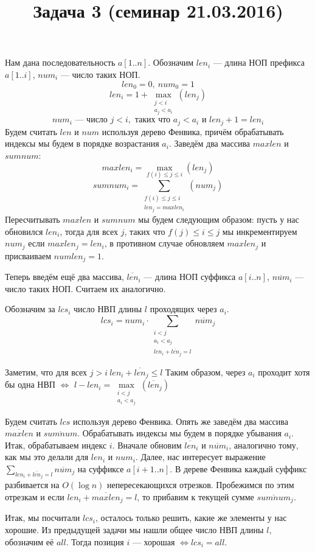 \documentclass{article}
\title{Задача 3 (семинар 21.03.2016)}
\author{}
\date{}
\newcommand{\olen}{\overline{len}}
\newcommand{\onum}{\overline{num}}
\newcommand{\omaxlen}{\overline{maxlen}}
\newcommand{\osumnum}{\overline{sumnum}}
\newcommand{\logn}{\log n}
\newcommand{\Ologn}{O(\logn)}
\begin{document}
\maketitle
Нам дана последовательность $a[1..n]$.
Обозначим $len_i$ --- длина НОП префикса $a[1..i]$, $num_i$ --- число таких НОП. 
$$len_0=0,\ num_0 = 1$$
$$len_i=1+\max\limits_{\substack{j<i\\ a_j<a_i}}(len_j)$$
$$num_i\text{ --- число } j<i, \text{ таких что } a_j<a_i \text{ и } len_j+1=len_i$$
Будем считать $len$ и $num$ используя дерево Фенвика, причём обрабатывать индексы мы будем в порядке возрастания $a_i$. Заведём два массива $maxlen$ и $sumnum$: 
$$maxlen_i=\max\limits_{f(i) \leq j \leq i}(len_j)$$
$$sumnum_i=\sum\limits_{\substack{f(i) \leq j \leq i\\ len_j=maxlen_i}}(num_j)$$
Пересчитывать $maxlen$ и $sumnum$ мы будем следующим образом: пусть у нас обновился $len_i$, тогда для всех $j$, таких что $f(j)\leq i\leq j$ мы инкрементируем $num_j$ если $maxlen_j=len_i$, в противном случае обновляем $maxlen_j$ и присваиваем $numlen_j=1$.

Теперь введём ещё два массива, $\olen_i$ --- длина НОП суффикса $a[i..n]$, $\onum_i$ --- число таких НОП. Считаем их аналогично.

Обозначим за $lcs_i$ число НВП длины $l$ проходящих через $a_i$.
$$lcs_i=num_i\cdot \sum\limits_{\substack{i<j\\ a_i<a_j\\ len_i+\olen_j=l}}\onum_j$$

Заметим, что для всех $j>i\ len_i+\olen_j\leq l$
Таким образом, через $a_i$ проходит хотя бы одна НВП $\iff$ $l-len_i=\max\limits_{\substack{i<j\\ a_i<a_j}}(\olen_j)$

Будем считать $lcs$ используя дерево Фенвика. Опять же заведём два массива $\omaxlen$ и $\osumnum$. Обрабатывать индексы мы будем в порядке убывания $a_i$. Итак, обрабатываем индекс $i$. Вначале обновим $\olen_i$ и $\onum_i$, аналогично тому, как мы это делали для $len_i$ и $num_i$. Далее, нас интересует выражение $\sum\limits_{len_i+\olen_j=l}\onum_j$ на суффиксе $a[i+1..n]$. В дереве Фенвика каждый суффикс разбивается на $\Ologn$ непересекающихся отрезков. Пробежимся по этим отрезкам и если $len_i+\omaxlen_j=l$, то прибавим к текущей сумме $\osumnum_j$.

Итак, мы посчитали $lcs_i$, осталось только решить, какие же элементы у нас хорошие. Из предыдущей задачи мы нашли общее число НВП длины $l$, обозначим её $all$. Тогда позиция $i$ --- хорошая $\iff lcs_i=all$.
\end{document}
